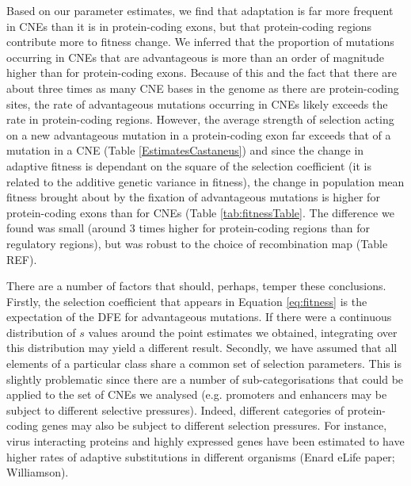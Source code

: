 \documentclass[11pt]{article}
\begin{document}
	Based on our parameter estimates, we find that adaptation is far more frequent in CNEs than it is in protein-coding exons, but that protein-coding regions contribute more to fitness change. We inferred that the proportion of mutations occurring in CNEs that are advantageous is more than an order of magnitude higher than for protein-coding exons. Because of this and the fact that there are about three times as many CNE bases in the genome as there are protein-coding sites, the rate of advantageous mutations occurring in CNEs likely exceeds the rate in protein-coding regions. However, the average strength of selection acting on a new advantageous mutation in a protein-coding exon far exceeds that of a mutation in a CNE (Table \ref{EstimatesCastaneus}) and since the change in adaptive fitness is dependant on the square of the selection coefficient (it is related to the additive genetic variance in fitness), the change in population mean fitness brought about by the fixation of advantageous mutations is higher for protein-coding exons than for CNEs (Table \ref{tab:fitnessTable}. The difference we found was small (around 3 times higher for protein-coding regions than for regulatory regions), but was robust to the choice of recombination map (Table REF).
	
	



	There are a number of factors that should, perhaps, temper these conclusions. Firstly, the selection coefficient that appears in Equation \ref{eq:fitness} is the expectation of the DFE for advantageous mutations. If there were a continuous distribution of $s$ values around the point estimates we obtained, integrating over this distribution may yield a different result. Secondly, we have assumed that all elements of a particular class share a common set of selection parameters. This is slightly problematic since there are a number of sub-categorisations that could be applied to the set of CNEs we analysed (e.g. promoters and enhancers may be subject to different selective pressures). Indeed, different categories of protein-coding genes may also be subject to different selection pressures. For instance, virus interacting proteins and highly expressed genes have been estimated to have higher rates of adaptive substitutions in different organisms (Enard eLife paper; Williamson).
\end{document}
